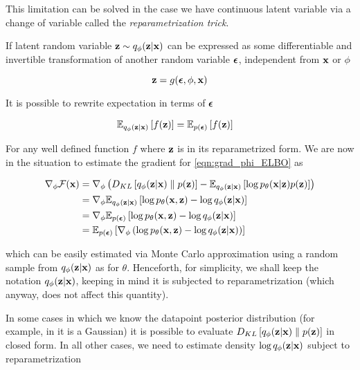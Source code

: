 \documentclass[12pt]{article}
\begin{document}
This limitation can be solved in the case we have continuous latent variable via a change of variable called the \textit{reparametrization trick}.


If latent random variable \(\textbf{z} \sim q_\phi (\textbf{z}|\textbf{x})\) can be expressed as some differentiable and invertible transformation of another random variable \(\bm{\epsilon}\), independent from \(\textbf{x}\) or \(\phi\)

\begin{equation}
    \textbf{z} = g(\bm{\epsilon}, \phi, \textbf{x})
\end{equation}

It is possible to rewrite expectation in terms of \(\bm{\epsilon}\) \cite{kingma2022autoencoding}\cite{VAEIntro}

\begin{align}
    \label{eqn:reparametrization}
    \mathbb{E}_{q_{\phi}(\textbf{z}|\textbf{x})} \left[f(\textbf{z}) \right] 
    &= \mathbb{E}_{p(\bm{\epsilon})} \left[f(\textbf{z}) \right]
\end{align}

For any well defined function \(f\) where \(\textbf{z}\) is in its reparametrized form. We are now in the situation to estimate the gradient for \eqref{eqn:grad_phi_ELBO} as

\begin{align}
    \nabla_{\phi}\mathcal{F}(\textbf{x}) &= \nabla_{\phi} \left( D_{KL}\left[ q_{\phi}(\textbf{z}|\textbf{x}) \parallel p(\textbf{z}) \right] - \mathbb{E}_{q_{\phi}(\textbf{z}|\textbf{x})} \left[ \log p_{\theta}(\textbf{x}|\textbf{z})p(\textbf{z}) \right] \right) \nonumber \\
    &= \nabla_{\phi} \mathbb{E}_{q_{\phi}(\textbf{z}|\textbf{x})} \left[\log p_\theta (\textbf{x}, \textbf{z}) - \log q_\phi (\textbf{z}|\textbf{x}) \right] \nonumber \\
    &= \nabla_{\phi} \mathbb{E}_{p(\bm{\epsilon})} \left[\log p_\theta (\textbf{x}, \textbf{z}) - \log q_\phi (\textbf{z}|\textbf{x}) \right] \nonumber \\
    &= \mathbb{E}_{p(\bm{\epsilon})} \left[\nabla_{\phi} \left( \log p_\theta (\textbf{x}, \textbf{z}) - \log q_\phi (\textbf{z}|\textbf{x}) \right) \right] 
\end{align}

which can be easily estimated via Monte Carlo approximation using a random sample from \(q_\phi (\textbf{z}|\textbf{x})\) as for \(\theta\). Henceforth, for simplicity, we shall keep the notation \(q_{\phi}(\textbf{z}|\textbf{x})\), keeping in mind it is subjected to reparametrization (which anyway, does not affect this quantity).


In some cases in which we know the datapoint posterior distribution (for example, in \cite{kingma2022autoencoding} it is a Gaussian) it is possible to evaluate \(D_{KL}\left[ q_{\phi}(\textbf{z}|\textbf{x}) \parallel p(\textbf{z}) \right]\) in closed form. In all other cases, we need to estimate density \(\log q_\phi (\textbf{z}|\textbf{x})\) subject to reparametrization
\end{document}
